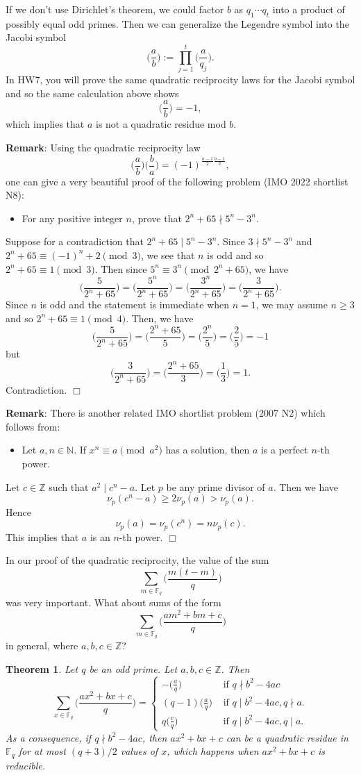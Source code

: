 \documentclass{article}
\def\Z{{\mathbb Z}}
\def\F{{\mathbb F}}
\def\N{{\mathbb N}}
\def\Z{{\mathbb Z}}
\def\F{{\mathbb F}}
\def\v{{\vspace{5pt}}}
\newtheorem{theorem}[subsection]{Theorem}
\renewcommand{\lg}[2]{\Big(\frac{#1}{#2}\Big)}
\begin{document}
If we don't use Dirichlet's theorem, we could factor $b$ as $q_1\cdots q_t$ into a product of possibly equal odd primes. Then we can generalize the Legendre symbol into the Jacobi symbol
$$\lg{a}{b}:= \prod_{j=1}^t\lg{a}{q_j}.$$
In HW7, you will prove the same quadratic reciprocity laws for the Jacobi symbol and so the same calculation above shows $$\lg{a}{b} = -1,$$
which implies that $a$ is not a quadratic residue mod $b$.

\v
\noindent\textbf{Remark}: Using the quadratic reciprocity law
$$\lg{a}{b}\lg{b}{a} = (-1)^{\frac{a-1}{2}\frac{b-1}{2}},$$
one can give a very beautiful proof of the following problem (IMO 2022 shortlist N8): 
\begin{itemize}
    \item For any positive integer $n$, prove that $2^n + 65\nmid 5^n - 3^n$.
\end{itemize}
Suppose for a contradiction that $2^n + 65\mid 5^n - 3^n$. Since $3\nmid 5^n - 3^n$ and $2^n + 65 \equiv (-1)^n + 2\pmod{3}$, we see that $n$ is odd and so $2^n + 65 \equiv 1\pmod{3}$. Then since $5^n\equiv3^n\pmod{2^n + 65}$, we have
$$\lg{5}{2^n + 65} = \lg{5^n}{2^n + 65} = \lg{3^n}{2^n + 65} = \lg{3}{2^n + 65}.$$
Since $n$ is odd and the statement is immediate when $n = 1$, we may assume $n\geq 3$ and so $2^n + 65\equiv 1\pmod{4}$. Then, we have
$$\lg{5}{2^n + 65} = \lg{2^n + 65}{5} = \lg{2^n}{5} = \lg{2}{5} = -1$$
but
$$\lg{3}{2^n + 65} = \lg{2^n + 65}{3} = \lg{1}{3} = 1.$$
Contradiction. $\Box$

\v
\noindent\textbf{Remark}: There is another related IMO shortlist problem (2007 N2) which follows from:
\begin{itemize}
    \item Let $a,n\in\N$. If $x^n\equiv a\pmod{a^2}$ has a solution, then $a$ is a perfect $n$-th power.
\end{itemize}
Let $c\in\Z$ such that $a^2\mid c^n - a$. Let $p$ be any prime divisor of $a$. Then we have
$$\nu_p(c^n - a) \geq 2\nu_p(a) > \nu_p(a).$$
Hence $$\nu_p(a) = \nu_p(c^n) = n\nu_p(c).$$
This implies that $a$ is an $n$-th power. $\Box$

\vspace{5pt}
In our proof of the quadratic reciprocity, the value of the sum
$$\sum_{m\in\F_q}\lg{m(t-m)}{q}$$
was very important. What about sums of the form
$$\sum_{m\in\F_q}\lg{am^2 + bm + c}{q}$$
in general, where $a,b,c\in\Z$?

\begin{theorem}
    Let $q$ be an odd prime. Let $a,b,c\in\Z$. Then
    $$\sum_{x\in\F_q}\lg{ax^2 + bx + c}{q} = \begin{cases}
        -\displaystyle\lg{a}{q}&\mbox{ if }q\nmid b^2 - 4ac\\
        \displaystyle(q-1)\lg{a}{q}&\mbox{ if }q\mid b^2 - 4ac,q\nmid a.\\
        \displaystyle q\lg{c}{q}&\mbox{ if }q\mid b^2 - 4ac,q\mid a.
    \end{cases}$$
    As a consequence, if $q\nmid b^2 - 4ac$, then $ax^2 + bx + c$ can be a quadratic residue in $\F_q$ for at most $(q+3)/2$ values of $x$, which happens when $ax^2 + bx + c$ is reducible.
\end{theorem}
\end{document}
